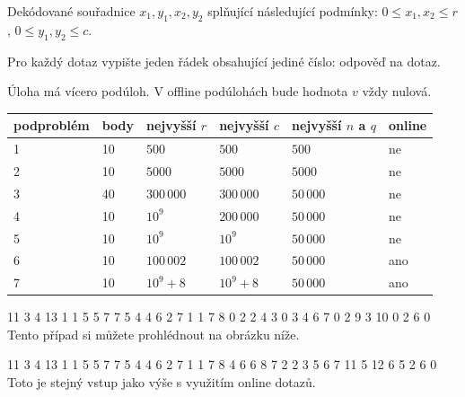 Dekódované souřadnice $x_1, y_1, x_2, y_2$ splňující následující podmínky:
$0 \leq x_1, x_2 \leq r$, $0 \leq y_1, y_2 \leq c$. 


Pro každý dotaz vypište jeden řádek obsahující jediné číslo: odpověď na dotaz.


Úloha má vícero podúloh. V offline podúlohách bude hodnota $v$ vždy nulová.

\bigskip

\begin{center}
\begin{tabular}{|l|l|l|l|l|l|}
\hline
podproblém & body & nejvyšší $r$  & nejvyšší $c$   & nejvyšší $n$ a $q$ & online    \\ \hline
1       & 10     & $500$        & $500$         & $500$     & ne        \\ \hline
2       & 10     & $5000$       & $5000$        & $5000$    & ne        \\ \hline
3       & 40     & $300\,000$   & $300\,000$    & $50\,000$ & ne        \\ \hline
4       & 10     & $10^9$       & $200\,000$    & $50\,000$ & ne        \\ \hline
5       & 10     & $10^9$       & $10^9$        & $50\,000$ & ne        \\ \hline
6       & 10     & $100\,002$   & $100\,002$    & $50\,000$ & ano       \\ \hline
7       & 10     & $10^9 + 8$   & $10^9 + 8$    & $50\,000$ & ano       \\ \hline
\end{tabular}
\end{center}



 11 3 4 13
1 1 5 5
7 7 5 4
4 6 2 7
1 1 7 8 0
2 2 4 3 0
3 4 6 7 0
2 9 3 10 0
2
6
0
\sampleCOMMENT
Tento případ si můžete prohlédnout na obrázku níže.
\sampleEND
{}

 11 3 4 13
1 1 5 5
7 7 5 4
4 6 2 7
1 1 7 8 4
6 6 8 7 2
2 3 5 6 7
11 5 12 6 5
2
6
0
\sampleCOMMENT
Toto je stejný vstup jako výše s využitím online dotazů.
\sampleEND

